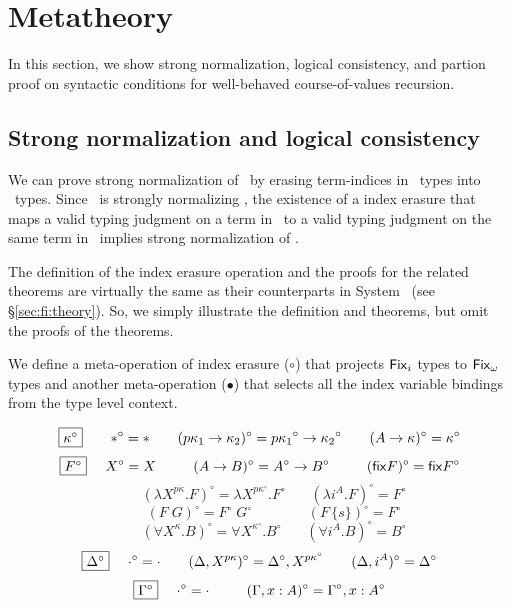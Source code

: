 \section{Metatheory} \label{sec:fixi:theory}
In this section, we show strong normalization, logical consistency, and
partion proof on syntactic conditions for well-behaved course-of-values
recursion.
\subsection{Strong normalization and logical consistency}
\label{ssec:fixi:theory:sn}
We can prove strong normalization of \Fixi\ by erasing term-indices in \Fixi\ 
types into \Fixw\ types. Since \Fixw\ is strongly normalizing \cite{AbeMat04},
the existence of a index erasure that maps a valid typing judgment on a term
in \Fixi\ to a valid typing judgment on the same term in \Fixw\ implies
strong normalization of \Fixi.

The definition of the index erasure operation and the proofs for
the related theorems are virtually the same as their counterparts
in System \Fi\ (see \S\ref{sec:fi:theory}). So, we simply illustrate
the definition and theorems, but omit the proofs of the theorems.

We define a meta-operation of index erasure ($\circ$) that
projects $\Fixi$ types to $\Fixw$ types and another meta-operation ($\bullet$)
that selects all the index variable bindings from the type level context.
\begin{definition}[index erasure]\label{def:Fixierase}
\[ \fbox{$\kappa^\circ$}
 ~~~~ ~~
 *^\circ =
 *
 ~~~~ ~~
 (p\kappa_1 -> \kappa_2)^\circ =
 p{\kappa_1}^\circ -> {\kappa_2}^\circ
 ~~~~ ~~
 (A -> \kappa)^\circ =
 \kappa^\circ
\]
\[ \fbox{$F^\circ$}
 ~~~~
 X^\circ =
 X
 ~~~~ ~~~~
 (A -> B)^\circ =
 A^\circ -> B^\circ
 ~~~~ ~~~~
 (\mathsf{fix} F)^\circ =
 \mathsf{fix} F^\circ
\]
\[ \qquad
 (\lambda X^{p\kappa}.F)^\circ =
 \lambda X^{p\kappa^\circ}.F^\circ
 ~~~~ ~~~~
 (\lambda i^A.F)^\circ =
 F^\circ
\]
\[ \qquad
 (F\;G)^\circ =
 F^\circ\;G^\circ
 ~~~~ ~~~~ ~~~~ ~~~~ ~~
 (F\,\{s\})^\circ =
 F^\circ
\]
\[ \qquad
 (\forall X^\kappa . B)^\circ =
 \forall X^{\kappa^\circ} . B^\circ
 ~~~~ ~~~~
 (\forall i^A . B)^\circ =
 B^\circ
\]
\[ \fbox{$\Delta^\circ$}
 ~~~~
 \cdot^\circ = \cdot
 ~~~~ ~~
 (\Delta,X^{p\kappa})^\circ = \Delta^\circ,X^{p\kappa^\circ}
 ~~~~ ~~
 (\Delta,i^A)^\circ = \Delta^\circ
\]
\[ \fbox{$\Gamma^\circ$}
 ~~~~
 \cdot^\circ = \cdot
 ~~~~ ~~~~
 (\Gamma,x:A)^\circ = \Gamma^\circ,x:A^\circ
\]
\end{definition}

